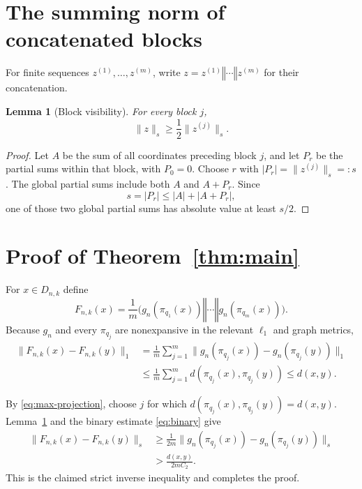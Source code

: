 \documentclass[11pt]{article}
\newtheorem{lemma}[theorem]{Lemma}
\newcommand{\ellone}{\ell_1}
\newcommand{\snorm}[1]{\lVert #1\rVert_s}
\newcommand{\onorm}[1]{\lVert #1\rVert_1}
\begin{document}
\section{The summing norm of concatenated blocks}

For finite sequences $z^{(1)},\ldots,z^{(m)}$, write
$z=z^{(1)}\mathbin\Vert\cdots\mathbin\Vert z^{(m)}$ for their concatenation.

\begin{lemma}[Block visibility]\label{lem:block}
For every block $j$,
\[
                         \snorm{z}\ge\frac12\snorm{z^{(j)}}.
\]
\end{lemma}

\begin{proof}
Let $A$ be the sum of all coordinates preceding block $j$, and let $P_r$ be
the partial sums within that block, with $P_0=0$.  Choose $r$ with
$|P_r|=\snorm{z^{(j)}}=:s$.  The global partial sums include both $A$ and
$A+P_r$.  Since
\[
                  s=|P_r|\le |A|+|A+P_r|,
\]
one of those two global partial sums has absolute value at least $s/2$.
\end{proof}

\section{Proof of Theorem~\ref{thm:main}}

For $x\in D_{n,k}$ define
\begin{equation}\label{eq:construction}
 F_{n,k}(x)=\frac1m\bigl(
   g_n(\pi_{q_1}(x))\mathbin\Vert\cdots\mathbin\Vert
   g_n(\pi_{q_m}(x))\bigr).
\end{equation}
Because $g_n$ and every $\pi_{q_j}$ are nonexpansive in the relevant
$\ellone$ and graph metrics,
\begin{align*}
 \onorm{F_{n,k}(x)-F_{n,k}(y)}
 &=\frac1m\sum_{j=1}^m
   \onorm{g_n(\pi_{q_j}(x))-g_n(\pi_{q_j}(y))}\\
 &\le\frac1m\sum_{j=1}^m
   d(\pi_{q_j}(x),\pi_{q_j}(y))
 \le d(x,y).
\end{align*}

By \eqref{eq:max-projection}, choose $j$ for which
$d(\pi_{q_j}(x),\pi_{q_j}(y))=d(x,y)$.  Lemma~\ref{lem:block} and the binary
estimate \eqref{eq:binary} give
\begin{align*}
 \snorm{F_{n,k}(x)-F_{n,k}(y)}
 &\ge \frac{1}{2m}
 \snorm{g_n(\pi_{q_j}(x))-g_n(\pi_{q_j}(y))}\\
 &>\frac{d(x,y)}{2mC_2}.
\end{align*}
This is the claimed strict inverse inequality and completes the proof.
\end{document}
